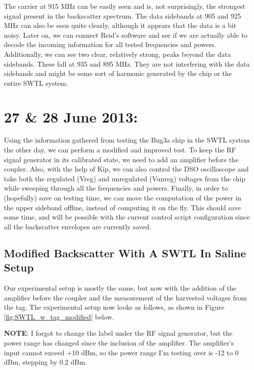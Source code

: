 \documentclass[12pt,onecolumn,titlepage]{article}
\begin{document}
The carrier at 915 MHz can be easily seen and is, not surprisingly, the strongest signal present in the backscatter spectrum. The data sidebands at 905 and 925 MHz can also be seen quite clearly, although it appears that the data is a bit noisy. Later on, we can connect Reid's software and see if we are actually able to decode the incoming information for all tested frequencies and powers. Additionally, we can see two clear, relatively strong, peaks beyond the data sidebands. These fall at 935 and 895 MHz. They are not interfering with the data sidebands and might be some sort of harmonic generated by the chip or the entire SWTL system. 




\clearpage
\section{27 \& 28 June 2013:}

\indent \indent Using the information gathered from testing the Bug3a chip in the SWTL system the other day, we can perform a modified and improved test. To keep the RF signal generator in its calibrated state, we need to add an amplifier before the coupler. Also, with the help of Kip, we can also control the DSO oscilloscope and take both the regulated (Vreg) and unregulated (Vunreg) voltages from the chip while sweeping through all the frequencies and powers. Finally, in order to (hopefully) save on testing time, we can move the computation of the power in the upper sideband offline, instead of computing it on the fly. This should save some time, and will be possible with the current control script configuration since all the backscatter envelopes are currently saved.

\subsection{Modified Backscatter With A SWTL In Saline Setup}
\indent \indent Our experimental setup is mostly the same, but now with the addition of the amplifier before the coupler and the measurement of the harvested voltages from the tag. The experimental setup now looks as follows, as shown in Figure \ref{fig:SWTL_w_tag_modified} below.

{\bf NOTE}: I forgot to change the label under the RF signal generator, but the power range has changed since the inclusion of the amplifier. The amplifier's input cannot exceed +10 dBm, so the power range I'm testing over is -12 to 0 dBm, stepping by 0.2 dBm.
\end{document}
